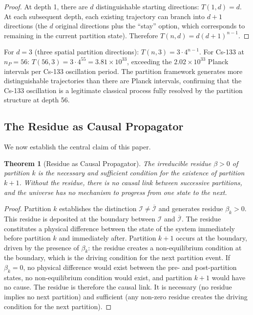\documentclass[11pt,twocolumn,a4paper]{article}
\theoremstyle{plain}
\newtheorem{theorem}{Theorem}[section]
\theoremstyle{definition}
\theoremstyle{remark}
\begin{document}
\begin{proof}
At depth 1, there are $d$ distinguishable starting directions: $T(1,d) = d$.
At each subsequent depth, each existing trajectory can branch into $d+1$
directions (the $d$ original directions plus the ``stay'' option, which
corresponds to remaining in the current partition state). Therefore
$T(n,d) = d(d+1)^{n-1}$.
\end{proof}

For $d=3$ (three spatial partition directions): $T(n,3) = 3 \cdot 4^{n-1}$.
For Cs-133 at $n_P = 56$: $T(56,3) = 3 \cdot 4^{55} = 3.81 \times 10^{33}$,
exceeding the $2.02 \times 10^{33}$ Planck intervals per Cs-133 oscillation
period. The partition framework generates more distinguishable trajectories than
there are Planck intervals, confirming that the Cs-133 oscillation is a
legitimate classical process fully resolved by the partition structure at
depth 56.

\subsection{The Residue as Causal Propagator}
\label{subsec:causal_residue}

We now establish the central claim of this paper.

\begin{theorem}[Residue as Causal Propagator]
\label{thm:causal_residue}
The irreducible residue $\beta > 0$ of partition $k$ is the necessary and
sufficient condition for the existence of partition $k+1$. Without the residue,
there is no causal link between successive partitions, and the universe has no
mechanism to progress from one state to the next.
\end{theorem}

\begin{proof}
Partition $k$ establishes the distinction $\mathcal{I} \neq \overline{\mathcal{I}}$
and generates residue $\beta_k > 0$. This residue is deposited at the boundary
between $\mathcal{I}$ and $\overline{\mathcal{I}}$. The residue constitutes a
physical difference between the state of the system immediately before partition
$k$ and immediately after. Partition $k+1$ occurs at the boundary, driven by the
presence of $\beta_k$: the residue creates a non-equilibrium condition at the
boundary, which is the driving condition for the next partition event. If
$\beta_k = 0$, no physical difference would exist between the pre- and
post-partition states, no non-equilibrium condition would exist, and partition
$k+1$ would have no cause. The residue is therefore the causal link. It is
necessary (no residue implies no next partition) and sufficient (any non-zero
residue creates the driving condition for the next partition).
\end{proof}
\end{document}
